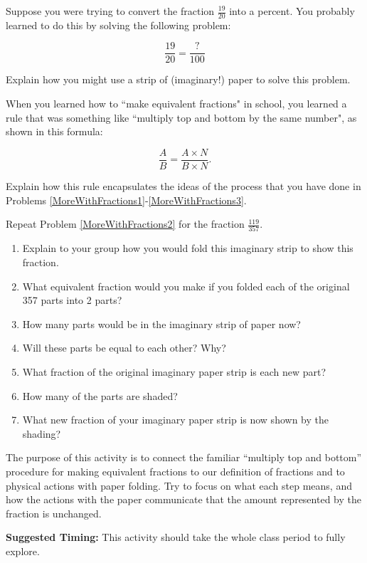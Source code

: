 \documentclass{ximera}
\begin{document}
\newpage

\begin{problem}\label{MoreWithFractions3}
Suppose you were trying to convert the fraction $\frac{19}{20}$ into a percent.  You probably learned to do this by solving the following problem:

\[ \frac{19}{20} = \frac{?}{100} \]

Explain how you might use a strip of (imaginary!) paper  to solve this problem.
\end{problem}




\begin{problem}
When you learned how to ``make equivalent fractions" in school, you learned a rule that was something like ``multiply top and bottom by the same number", as shown in this formula:

  \[ \frac{A}{B} = \frac{A \times N}{B \times N}. \]

Explain how this rule encapsulates the ideas of the process that you have done in Problems \ref{MoreWithFractions1}-\ref{MoreWithFractions3}.
\end{problem}





\begin{problem}
 Repeat Problem \ref{MoreWithFractions2} for the fraction $\frac{119}{357}$. 
\begin{enumerate}
    \item Explain to your group how you would fold this imaginary strip to show this fraction.    
    \item What equivalent fraction would you make if you folded each of the original 357 parts into 2 parts?
   \item   How many parts would be in the imaginary strip of paper now?
    \item  Will these parts be equal to each other?  Why?
    \item   What fraction of the original imaginary paper strip is each new part?
    \item   How many of the parts are shaded?
    \item   What new fraction of your imaginary paper strip is now shown by the shading?  
\end{enumerate}
\end{problem}


\newpage

\begin{instructorNotes}
The purpose of this activity is to connect the familiar ``multiply top and bottom'' procedure for making equivalent fractions to our definition of fractions and to physical actions with paper folding.  Try to focus on what each step means, and how the actions with the paper communicate that the amount represented by the fraction is unchanged.




{\bf Suggested Timing:} This activity should take the whole class period to fully explore.
\end{instructorNotes}
\end{document}
